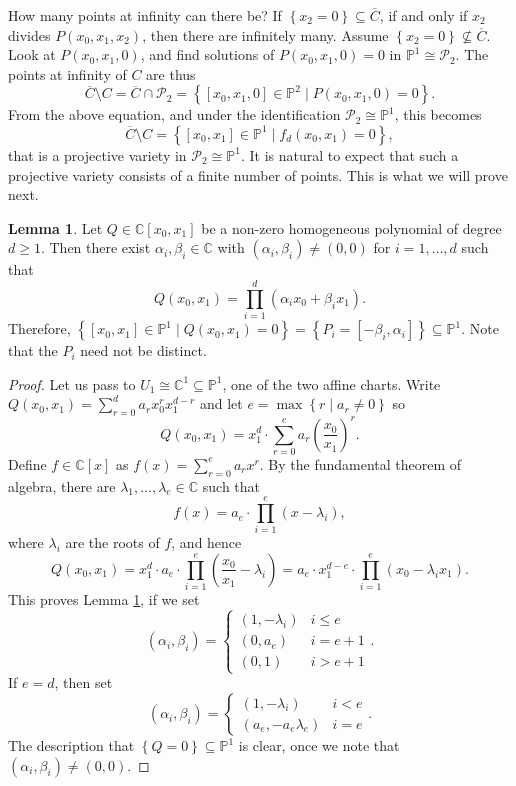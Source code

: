 \documentclass{article}
\newcommand{\C}{\mathbb{C}}
\renewcommand{\P}{\mathbb{P}}
\newcommand{\rb}[1]{\left( #1 \right)}
\renewcommand{\sb}[1]{\left[ #1 \right]}
\newcommand{\cb}[1]{\left\{ #1 \right\}}
\theoremstyle{definition}\newtheorem{definition}{Definition}[section]
\theoremstyle{definition}\newtheorem{notation}[definition]{Notation}
\theoremstyle{definition}\newtheorem{remark}[definition]{Remark}
\theoremstyle{definition}\newtheorem{example}[definition]{Example}
\theoremstyle{definition}\newtheorem{fact}{Fact}
\theoremstyle{definition}\newtheorem{exercise}{Exercise}
\newtheorem{lemma}[definition]{Lemma}
\begin{document}
How many points at infinity can there be? If $ \cb{x_2 = 0} \subseteq \overline{C} $, if and only if $ x_2 $ divides $ P\rb{x_0, x_1, x_2} $, then there are infinitely many. Assume $ \cb{x_2 = 0} \not\subseteq \overline{C} $. Look at $ P\rb{x_0, x_1, 0} $, and find solutions of $ P\rb{x_0, x_1, 0} = 0 $ in $ \P^1 \cong \mathcal{P}_2 $. The points at infinity of $ C $ are thus
$$ \overline{C} \setminus C = \overline{C} \cap \mathcal{P}_2 = \cb{\sb{x_0, x_1, 0} \in \P^2 \mid P\rb{x_0, x_1, 0} = 0}. $$
From the above equation, and under the identification $ \mathcal{P}_2 \cong \P^1 $, this becomes
$$ \overline{C} \setminus C = \cb{\sb{x_0, x_1} \in \P^1 \mid f_d\rb{x_0, x_1} = 0}, $$
that is a projective variety in $ \mathcal{P}_2 \cong \P^1 $. It is natural to expect that such a projective variety consists of a finite number of points. This is what we will prove next.

\begin{lemma}
\label{lem:6.2}
Let $ Q \in \C\sb{x_0, x_1} $ be a non-zero homogeneous polynomial of degree $ d \ge 1 $. Then there exist $ \alpha_i, \beta_i \in \C $ with $ \rb{\alpha_i, \beta_i} \ne \rb{0, 0} $ for $ i = 1, \dots, d $ such that
$$ Q\rb{x_0, x_1} = \prod_{i = 1}^d \rb{\alpha_ix_0 + \beta_ix_1}. $$
Therefore, $ \cb{\sb{x_0, x_1} \in \P^1 \mid Q\rb{x_0, x_1} = 0} = \cb{P_i = \sb{-\beta_i, \alpha_i}} \subseteq \P^1 $. Note that the $ P_i $ need not be distinct.
\end{lemma}

\begin{proof}
Let us pass to $ U_1 \cong \C^1 \subseteq \P^1 $, one of the two affine charts. Write $ Q\rb{x_0, x_1} = \sum_{r = 0}^d a_rx_0^rx_1^{d - r} $ and let $ e = \max\cb{r \mid a_r \ne 0} $ so
$$ Q\rb{x_0, x_1} = x_1^d \cdot \sum_{r = 0}^e a_r\rb{\dfrac{x_0}{x_1}}^r. $$
Define $ f \in \C\sb{x} $ as $ f\rb{x} = \sum_{r = 0}^e a_rx^r $. By the fundamental theorem of algebra, there are $ \lambda_1, \dots, \lambda_e \in \C $ such that
$$ f\rb{x} = a_e \cdot \prod_{i = 1}^e \rb{x - \lambda_i}, $$
where $ \lambda_i $ are the roots of $ f $, and hence
$$ Q\rb{x_0, x_1} = x_1^d \cdot a_e \cdot \prod_{i = 1}^e \rb{\dfrac{x_0}{x_1} - \lambda_i} = a_e \cdot x_1^{d - e} \cdot \prod_{i = 1}^e \rb{x_0 - \lambda_ix_1}. $$
This proves Lemma \ref{lem:6.2}, if we set
$$ \rb{\alpha_i, \beta_i} = \begin{cases} \rb{1, -\lambda_i} & i \le e \\ \rb{0, a_e} & i = e + 1 \\ \rb{0, 1} & i > e + 1 \end{cases}. $$
If $ e = d $, then set
$$ \rb{\alpha_i, \beta_i} = \begin{cases} \rb{1, -\lambda_i} & i < e \\ \rb{a_e, -a_e\lambda_e} & i = e \end{cases}. $$
The description that $ \cb{Q = 0} \subseteq \P^1 $ is clear, once we note that $ \rb{\alpha_i, \beta_i} \ne \rb{0, 0} $.
\end{proof}
\end{document}
